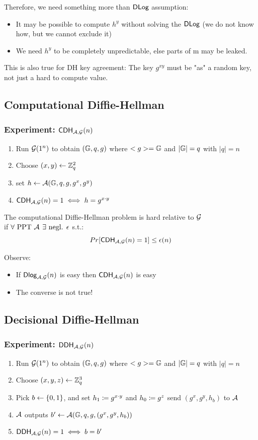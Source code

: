 \documentclass[12pt]{article}
\begin{document}
Therefore, we need something more than  $\mathsf{DLog}$ assumption: 
\begin{itemize}
\item It may be possible to compute $h^y$ without solving the  $\mathsf{DLog}$ (we do not know how, but we cannot exclude it)
\item We need $h^y$ to be completely unpredictable, else parts of m may be leaked.
\end{itemize}

This is also true for DH key agreement: The key $g^{xy}$ must be "as" a random key, not just a hard to compute value.
\newpage
\subsection{Computational Diffie-Hellman}
\subsubsection{Experiment: $\mathsf{CDH}_{\mathcal{A},\mathcal{G}}(n)$}
\begin{enumerate}
\item Run $\mathcal{G}(1^n)$ to obtain $(\mathbb{G},q,g)$ where $<g>=\mathbb{G}$ and $|\mathbb{G}|=q$ with $|q|=n$
\item Choose $(x,y )\leftarrow \mathbb{Z}_q^2$
\item set $h\leftarrow \mathcal{A}(\mathbb{G},q,g,g^x,g^y)$
\item $\mathsf{CDH}_{\mathcal{A},\mathcal{G}}(n)=1 \iff h=g^{x\cdot y}$ 
\end{enumerate}

The computational Diffie-Hellman problem is hard relative to $\mathcal{G}$\\
 if $\forall  \text{ PPT } \mathcal{A}$ $\exists \text{ negl. } \epsilon $ s.t.:
\begin{equation*}
Pr[\mathsf{CDH}_{\mathcal{A},\mathcal{G}}(n)=1] \le \epsilon(n)
\end{equation*}

Observe:
\begin{itemize}
\item If $\mathsf{Dlog}_{\mathcal{A},\mathcal{G}}(n)$ is easy then $\mathsf{CDH}_{\mathcal{A},\mathcal{G}}(n)$ is easy
\item The converse is not true!
\end{itemize}


\subsection{Decisional Diffie-Hellman}
\subsubsection{Experiment: $\mathsf{DDH}_{\mathcal{A},\mathcal{G}}(n)$}
\begin{enumerate}
\item Run $\mathcal{G}(1^n)$ to obtain $(\mathbb{G},q,g)$ where $<g>=\mathbb{G}$ and $|\mathbb{G}|=q$ with $|q|=n$
\item Choose $(x,y,z )\leftarrow \mathbb{Z}_q^3$
\item Pick $b \leftarrow \{0, 1\}$, and set $h_1 \coloneqq g^{x\cdot y}$ and $h_0 \coloneqq g^z$ send $(g^x,g^y,h_b)$ to $\mathcal{A}$
\item $\mathcal{A}$ outputs $b'\leftarrow \mathcal{A}(\mathbb{G},q,g,(g^x,g^y,h_b))$
\item $\mathsf{DDH}_{\mathcal{A},\mathcal{G}}(n)=1 \iff b=b' $
\end{enumerate}
\end{document}
